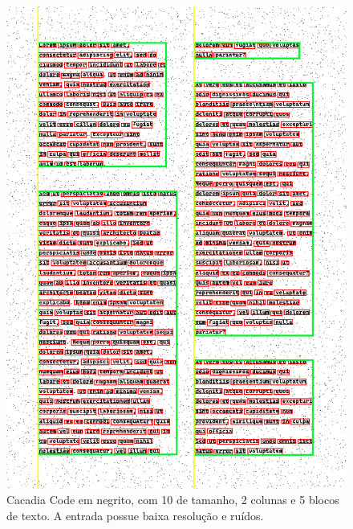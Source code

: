 \documentclass[english, 
               brazil, 
               bsc] %
               {dcomp-abntex2}
\begin{document}
\begin{figure}[H]
        \caption{\label{cascadia} \small Cacadia Code em negrito, com 10 de tamanho, 2 colunas e 5 blocos de texto. A entrada possue baixa resolução e ruídos. }
        \begin{center}
            \includegraphics[scale=0.55]{./images/cascadia_code_10_detected_colunas_2_blocos_5_linhas_42_palavras_395.png}
        \end{center}
\end{figure}
\end{document}
